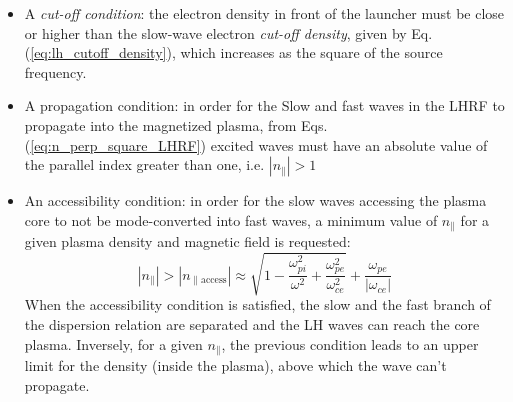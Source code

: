 \begin{itemize}
	\item  A \emph{cut-off condition}: the electron density in front of the launcher must be close or higher than the slow-wave electron \emph{cut-off density}, given by Eq.(\ref{eq:lh_cutoff_density}), which increases as the square of the source frequency. 
	\item A propagation condition: in order for the Slow and fast waves in the LHRF to propagate into the magnetized plasma, from Eqs.(\ref{eq:n_perp_square_LHRF}) excited waves must have an absolute value of the parallel index greater than one, i.e. $|n_{\parallel}|>1$ 
	\item An accessibility condition: in order for the slow waves accessing the plasma core to not be mode-converted into fast waves, a minimum value of $n_{\parallel}$ for a given plasma density and magnetic field is requested:
	$$
	|n_{\parallel} |>| n_{\parallel \mathrm{access}} | 
	\approx 
	\sqrt{1 
		- \frac{\omega_{pi}^2}{\omega^2} 
		+ \frac{\omega_{pe}^2}{\omega_{ce}^2}}
	+ \frac{\omega_{pe} }{| \omega_{ce} |}
	$$ 
	When the accessibility condition is satisfied, the slow and the fast branch of the dispersion relation are separated and the LH waves can reach the core plasma. Inversely, for a given $n_{\parallel}$, the previous condition leads to an upper limit for the density (inside the plasma), above which the wave can’t propagate.
\end{itemize}


